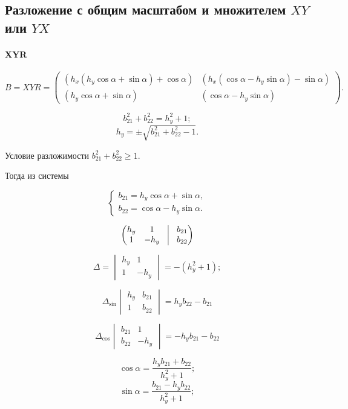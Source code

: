 \subsection{Разложение с общим масштабом и множителем $XY$ или $YX$}

\paragraph{XYR}


$$B = XYR =
\begin{pmatrix}
	\left( {h_x} \left( {h_y} \cos{\alpha} + \sin{\alpha}\right) + \cos{\alpha}\right) & 
	\left( {h_x} \left( \cos{\alpha} - {h_y}\sin{\alpha} \right) - \sin{\alpha}\right) \\
	\left( {h_y} \cos{\alpha} + \sin{\alpha}\right) & 
	\left( \cos{\alpha} - {h_y} \sin{\alpha}\right)
\end{pmatrix}.
$$

$$b_{21}^2 + b_{22}^2 = h_y^2 + 1;$$
$$h_y = \pm \sqrt{b_{21}^2 + b_{22}^2 - 1}.$$

Условие разложимости $b_{21}^2 + b_{22}^2 \ge 1$.

Тогда из системы

$$
\begin{cases}
	b_{21} = {h_y} \cos{\alpha} + \sin{\alpha},\\
	b_{22} = \cos{\alpha} - {h_y} \sin{\alpha}.
\end{cases}
$$

$$\begin{pmatrix}
	h_y & 1 & \vrule & b_{21} \\
	1 & -h_y & \vrule  & b_{22}
\end{pmatrix}$$

$$\Delta = \begin{vmatrix}
	h_y & 1\\
	1 & -h_y
\end{vmatrix} = - (h_y^2 + 1);$$

$$\Delta_{\sin}\begin{vmatrix}
	h_y & b_{21}\\
	1 &   b_{22}
\end{vmatrix} = h_y b_{22} - b_{21}$$

$$\Delta_{\cos}\begin{vmatrix}
	b_{21} & 1\\
	b_{22} & -h_y
\end{vmatrix} = -h_y b_{21} - b_{22}$$

$$\cos\alpha = \frac{h_y b_{21} + b_{22}}{h_y^2 + 1};$$
$$\sin\alpha = \frac{b_{21} - h_y b_{22}}{h_y^2 + 1};$$

